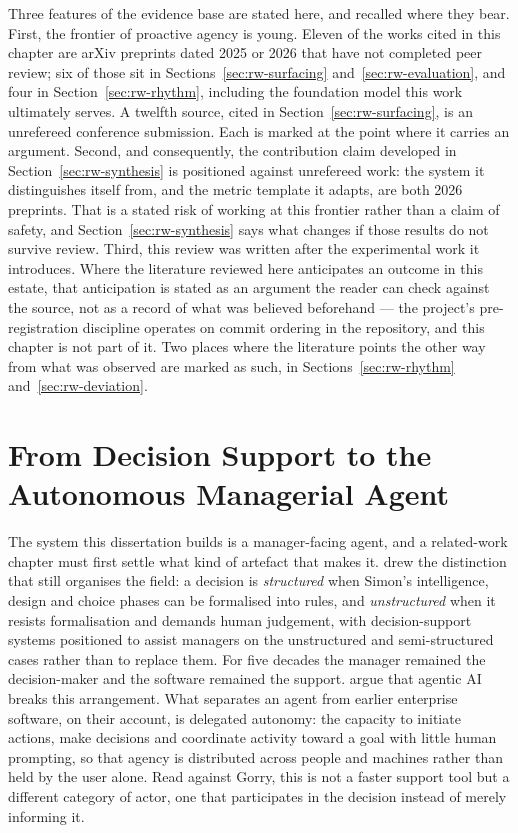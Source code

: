 Three features of the evidence base are stated here, and recalled where they
bear. First, the frontier of proactive agency is young. Eleven of the works
cited in this chapter are arXiv preprints dated 2025 or 2026 that have not
completed peer review; six of those sit in Sections~\ref{sec:rw-surfacing}
and~\ref{sec:rw-evaluation}, and four in Section~\ref{sec:rw-rhythm},
including the foundation model this work ultimately serves. A twelfth source,
cited in Section~\ref{sec:rw-surfacing}, is an unrefereed conference
submission. Each is marked at the point where it carries an argument. Second,
and consequently, the contribution claim developed in
Section~\ref{sec:rw-synthesis} is positioned against unrefereed work: the
system it distinguishes itself from, and the metric template it adapts, are
both 2026 preprints. That is a stated risk of working at this frontier rather
than a claim of safety, and Section~\ref{sec:rw-synthesis} says what changes if
those results do not survive review. Third, this review was written after the
experimental work it introduces. Where the literature reviewed here anticipates
an outcome in this estate, that anticipation is stated as an argument the
reader can check against the source, not as a record of what was believed
beforehand --- the project's pre-registration discipline operates on commit
ordering in the repository, and this chapter is not part of it. Two places
where the literature points the other way from what was observed are marked as
such, in Sections~\ref{sec:rw-rhythm} and~\ref{sec:rw-deviation}.

\section{From Decision Support to the Autonomous Managerial Agent}
\label{sec:rw-framing}

The system this dissertation builds is a manager-facing agent, and a
related-work chapter must first settle what kind of artefact that makes it.
\citet{gorry_framework_1971} drew the distinction that
still organises the field: a decision is \emph{structured} when Simon's
intelligence, design and choice phases can be formalised into rules, and
\emph{unstructured} when it resists formalisation and demands human judgement,
with decision-support systems positioned to assist managers on the
unstructured and semi-structured cases rather than to replace them. For five
decades the manager remained the decision-maker and the software remained the
support. \citet{kumar_agentic_2026} argue that agentic AI breaks
this arrangement. What separates an agent from earlier enterprise software,
on their account, is delegated autonomy: the capacity to initiate actions,
make decisions and coordinate activity toward a goal with little human
prompting, so that agency is distributed across people and machines rather
than held by the user alone. Read against Gorry, this is not a faster support
tool but a different category of actor, one that participates in the decision
instead of merely informing it.

